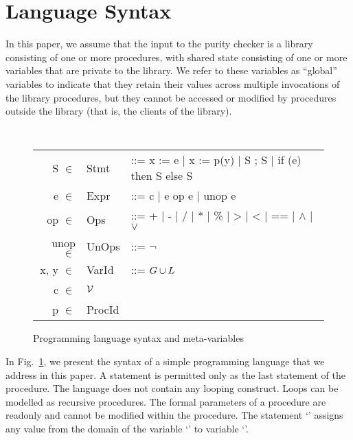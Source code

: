 \newcommand{\elt}{\ensuremath{\in} }
\newcommand{\domain}[1]{#1}

\section{Language Syntax}
\label{sec:background}

In this paper, we assume that the input to the purity checker is a library consisting
of one or more procedures, with shared state consisting of one or more variables
that are private to the library. We refer to these variables as ``global'' variables to
indicate that they retain their values across multiple invocations of the library
procedures, but they cannot be accessed or modified by procedures outside
the library (that is, the clients of the library).

\begin{figure}[t!]
{\tt
\begin{tabular}{rll}
S \elt & \domain{Stmt} & ::=  x := e | x := p(y) | S ; S | if (e) then S else S \\
e \elt & \domain{Expr} & ::= c | e op e | unop e \\
op \elt & \domain{Ops} & ::= + | - | / | * | \% | > | < | == | $\wedge$ | $\vee$ \\
unop \elt & \domain{UnOps} & ::= $\neg$ \\
x, y \elt & \domain{VarId} & ::= $G \cup L$ \\ 
c \elt & $\mathcal{V}$ \\
p \elt & \domain{ProcId}
\end{tabular}
}
\caption{Programming language syntax and meta-variables}
 \label{fig:grammar}
\end{figure}

In Fig.~\ref{fig:grammar}, we present the syntax of a simple
programming language that we address in this paper.
A  statement is permitted only as the last statement of
the procedure.
The language does not contain any looping construct.
Loops can be modelled as recursive procedures.
The formal parameters of a procedure are readonly and cannot be
modified within the procedure.
The
statement `' assigns any value from the domain of the variable
`' to variable `'.

